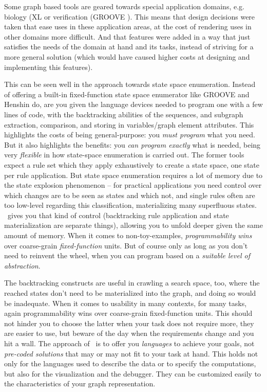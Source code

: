 Some graph based tools are geared towards special application domains, e.g. biology (XL \cite{xl} or verification (GROOVE \cite{Groove}).
This means that design decisions were taken that ease uses in these application areas, at the cost of rendering uses in other domains more difficult.
And that features were added in a way that just satisfies the needs of the domain at hand and its tasks, instead of striving for a more general solution (which would have caused higher costs at designing and implementing this features).

This can be seen well in the approach towards state space enumeration. 
Instead of offering a built-in fixed-function state space enumerator like GROOVE and Henshin do, are you given the language devices needed to program one with a few lines of code, with the backtracking abilities of the sequences, and subgraph extraction, comparison, and storing in variables/graph element attributes.
This highlights the costs of being general-purpose: you \emph{must program} what you need.
But it also highlights the benefits: you \emph{can program exactly} what is needed, being very \emph{flexible} in how state-space enumeration is carried out.
The former tools expect a rule set which they apply exhaustively to create a state space, one state per rule application. 
But state space enumeration requires a lot of memory due to the state explosion phenomenon -- for practical applications you need control over which changes are to be seen as states and which not, and single rules often are too low-level regarding this classification, materializing many superfluous states.
\GrG\ gives you that kind of control (backtracking rule application and state materialization are separate things), allowing you to unfold deeper given the same amount of memory. 
When it comes to non-toy-examples, \emph{programmability wins} over coarse-grain \emph{fixed-function} units.
But of course only as long as you don't need to reinvent the wheel, when you can program based on a \emph{suitable level of abstraction}.

The backtracking constructs are useful in crawling a search space, too, where the reached states don't need to be materialized into the graph, and doing so would be inadequate.
When it comes to usability in many contexts, for many tasks, again programmability wins over coarse-grain fixed-function units.
This should not hinder you to choose the latter when your task does not require more, they are easier to use, but beware of the day when the requirements change and you hit a wall.
The approach of \GrG\ is to offer you \emph{languages} to achieve your goals, not \emph{pre-coded solutions} that may or may not fit to your task at hand.
This holds not only for the languages used to describe the data or to specify the computations, but also for the visualization and the debugger. 
They can be customized easily to the characteristics of your graph representation. 

